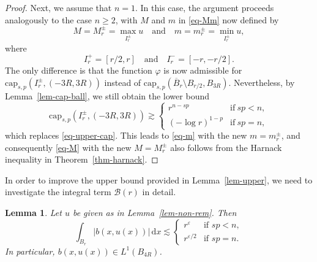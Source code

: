 \documentclass[11pt]{amsart}
\theoremstyle{plain}
\newtheorem{lemma}[theorem]{Lemma}
\theoremstyle{definition}
\numberwithin{equation}{section}
\begin{document}
\begin{proof}
Next, we assume that $n=1$. In this case, the argument proceeds analogously to the case $n\geq2$, with $M$ and $m$ in \eqref{eq-Mm} now defined by
\begin{equation}\label{eq-Mm-pm}
M= M_r^\pm = \max_{I_r^{\pm}}u \quad\text{and}\quad m= m_r^{\pm}=\min_{I_r^{\pm}}u,
\end{equation}
where
\begin{equation}\label{eq-interval}
I_r^{+}=[r/2, r] \quad\text{and}\quad I_r^-=[-r, -r/2].
\end{equation}
The only difference is that the function $\varphi$ is now admissible for $\mathrm{cap}_{s, p}(I_r^{\pm}, (-3R, 3R))$ instead of $\mathrm{cap}_{s, p}(\overline{B}_r \setminus B_{r/2}, B_{3R})$. Nevertheless, by Lemma~\ref{lem-cap-ball}, we still obtain the lower bound
\begin{equation}\label{eq-upper-cap-1d}
\mathrm{cap}_{s, p}(I_r^{\pm}, (-3R, 3R)) \gtrsim 
\begin{cases}
    r^{n-sp} &\text{if}~sp<n, \\
    (-\log r)^{1-p} &\text{if}~sp=n,
\end{cases}
\end{equation}
which replaces \eqref{eq-upper-cap}. This leads to \eqref{eq-m} with the new $m=m_r^\pm$, and consequently \eqref{eq-M} with the new $M=M_r^\pm$ also follows from the Harnack inequality in Theorem~\ref{thm-harnack}.
\end{proof}

In order to improve the upper bound provided in Lemma~\ref{lem-upper}, we need to investigate the integral term $\mathcal{B}(r)$ in detail.

\begin{lemma}\label{lem-integrable}
Let $u$ be given as in Lemma~\ref{lem-non-rem}. Then 
    \begin{equation*}
        \int_{B_r} |b(x, u(x))| \,\mathrm{d}x \lesssim 
        \begin{cases}
            r^{\varepsilon} & \text{if $sp<n$},\\
            r^{\varepsilon/2} & \text{if $sp=n$}.
        \end{cases}
    \end{equation*}
In particular, $b(x, u(x)) \in L^1(B_{4R})$.
\end{lemma}
\end{document}

